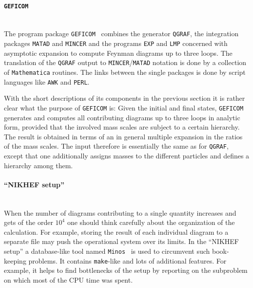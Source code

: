 
\paragraph{{\tt GEFICOM}}\mbox{}\\[1em]
%
The program package {\tt GEFICOM}~\cite{geficom} combines the generator
{\tt QGRAF}, the integration packages {\tt MATAD} and {\tt MINCER} and
the programs {\tt EXP} and {\tt LMP} concerned with asymptotic expansion
to compute Feynman diagrams up to three loops. The translation of the
{\tt QGRAF} output to {\tt MINCER}/{\tt MATAD} notation is done by a
collection of {\tt Mathematica} routines.  The links between the single
packages is done by script languages like {\tt AWK} and {\tt PERL}.

With the short descriptions of its components in the previous section it
is rather clear what the purpose of {\tt GEFICOM} is: Given the initial
and final states, {\tt GEFICOM} generates and computes all contributing
diagrams up to three loops in analytic form, provided that the involved
mass scales are subject to a certain hierarchy. The result is obtained in
terms of an in general multiple expansion in the ratios of the mass
scales. The input therefore is essentially the same as for {\tt QGRAF},
except that one additionally assigns masses to the different particles
and defines a hierarchy among them.


\paragraph{``NIKHEF setup''}\mbox{}\\[1em]
%
When the number of diagrams contributing to a single quantity increases
and gets of the order $10^4$ one should think carefully about the
organization of the calculation.  For example, storing the result of
each individual diagram to a separate file may push the operational
system over its limits.  In the ``NIKHEF setup'' a database-like tool
named {\tt Minos}~\cite{minos} is used to circumvent such book-keeping
problems.  It contains {\tt make}-like and lots of additional features.
For example, it helps to find bottlenecks of the setup by reporting on
the subproblem on which most of the CPU time was spent.

